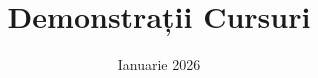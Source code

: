 



\title{\textbf{Demonstrații Cursuri}}
\date{Ianuarie 2026}

\maketitle

\newcommand{\addLecture}[1]{\newpage }


\addLecture{lecture_2}
\addLecture{lecture_3}
\addLecture{lecture_4}
\addLecture{lecture_5}
\addLecture{lecture_6}
\addLecture{lecture_7}
\addLecture{lecture_8}
\addLecture{lecture_9}

